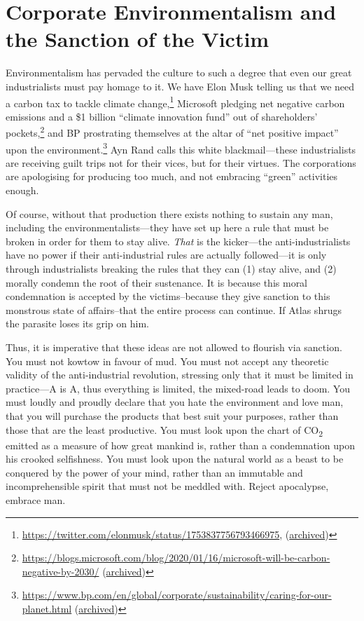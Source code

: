 \documentclass[11pt]{article}
\begin{document}
\section{Corporate Environmentalism and the Sanction of the Victim}
\label{sec:org2af5af7}
Environmentalism has pervaded the culture to such a degree that even our great industrialists must pay homage to it. We have Elon Musk telling us that we need a carbon tax to tackle climate change,\footnote{\url{https://twitter.com/elonmusk/status/1753837756793466975}, (\href{https://archive.ph/17E7w}{archived})} Microsoft pledging net negative carbon emissions and a \$1 billion ``climate innovation fund'' out of shareholders' pockets,\footnote{\url{https://blogs.microsoft.com/blog/2020/01/16/microsoft-will-be-carbon-negative-by-2030/} (\href{https://archive.ph/YDI73}{archived})} and BP prostrating themselves at the altar of ``net positive impact'' upon the environment.\footnote{\url{https://www.bp.com/en/global/corporate/sustainability/caring-for-our-planet.html} (\href{https://archive.ph/RpzT7}{archived})} Ayn Rand calls this white blackmail---these industrialists are receiving guilt trips not for their vices, but for their virtues. The corporations are apologising for producing too much, and not embracing ``green'' activities enough.

Of course, without that production there exists nothing to sustain any man, including the environmentalists---they have set up here a rule that must be broken in order for them to stay alive. \emph{That} is the kicker---the anti-industrialists have no power if their anti-industrial rules are actually followed---it is only through industrialists breaking the rules that they can (1) stay alive, and (2) morally condemn the root of their sustenance. It is because this moral condemnation is accepted by the victims--because they give sanction to this monstrous state of affairs--that the entire process can continue. If Atlas shrugs the parasite loses its grip on him.

Thus, it is imperative that these ideas are not allowed to flourish via sanction. You must not kowtow in favour of mud. You must not accept any theoretic validity of the anti-industrial revolution, stressing only that it must be limited in practice---A is A, thus everything is limited, the mixed-road leads to doom. You must loudly and proudly declare that you hate the environment and love man, that you will purchase the products that best suit your purposes, rather than those that are the least productive. You must look upon the chart of CO\textsubscript{2} emitted as a measure of how great mankind is, rather than a condemnation upon his crooked selfishness. You must look upon the natural world as a beast to be conquered by the power of your mind, rather than an immutable and incomprehensible spirit that must not be meddled with. Reject apocalypse, embrace man.
\end{document}
